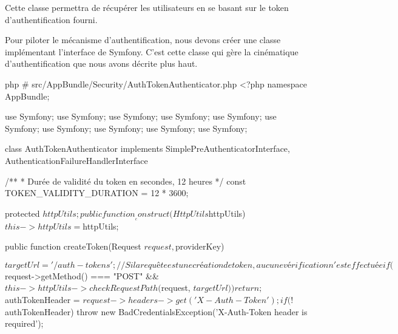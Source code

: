 \documentclass[big]{zmdocument}
\begin{document}
Cette classe permettra de récupérer les utilisateurs en se basant sur le token d'authentification fourni.



Pour piloter le mécanisme d'authentification, nous devons créer une classe implémentant l'interface  de Symfony. C'est cette classe qui gère la cinématique d'authentification que nous avons décrite plus haut.



\begin{CodeBlock}{php}
# src/AppBundle/Security/AuthTokenAuthenticator.php
<?php
namespace AppBundle\Security;

use Symfony\Component\HttpFoundation\Request;
use Symfony\Component\Security\Core\Authentication\Token\PreAuthenticatedToken;
use Symfony\Component\Security\Core\Authentication\Token\TokenInterface;
use Symfony\Component\Security\Core\Exception\AuthenticationException;
use Symfony\Component\Security\Core\Exception\CustomUserMessageAuthenticationException;
use Symfony\Component\Security\Core\Exception\BadCredentialsException;
use Symfony\Component\Security\Core\User\UserProviderInterface;
use Symfony\Component\Security\Http\Authentication\AuthenticationFailureHandlerInterface;
use Symfony\Component\Security\Http\Authentication\SimplePreAuthenticatorInterface;
use Symfony\Component\Security\Http\HttpUtils;

class AuthTokenAuthenticator implements SimplePreAuthenticatorInterface, AuthenticationFailureHandlerInterface
{
    /**
    * Durée de validité du token en secondes, 12 heures
    */
    const TOKEN_VALIDITY_DURATION = 12 * 3600;

    protected $httpUtils;

    public function __construct(HttpUtils $httpUtils)
    {
        $this->httpUtils = $httpUtils;
    }

    public function createToken(Request $request, $providerKey)
    {

        $targetUrl = '/auth-tokens';
        // Si la requête est une création de token, aucune vérification n'est effectuée
        if ($request->getMethod() === "POST" && $this->httpUtils->checkRequestPath($request, $targetUrl)) {
            return;
        }
      
        $authTokenHeader = $request->headers->get('X-Auth-Token');

        if (!$authTokenHeader) {
            throw new BadCredentialsException('X-Auth-Token header is required');
        }

}}
\end{CodeBlock}
\end{document}
